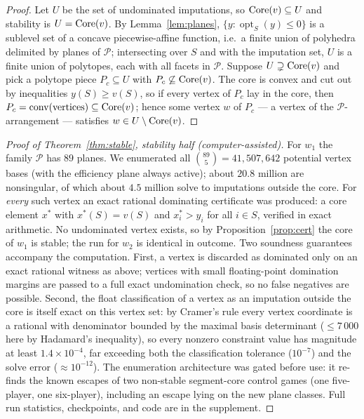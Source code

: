 \begin{proof}
Let $U$ be the set of undominated imputations, so $\operatorname{Core}(v)\subseteq U$ and
stability is $U=\operatorname{Core}(v)$. By Lemma~\ref{lem:planes},
$\{y:\operatorname{opt}_S(y)\le0\}$ is a sublevel set of a concave
piecewise-affine function, i.e.\ a finite union of polyhedra delimited by
planes of $\mathcal P$; intersecting over $S$ and with the imputation set, $U$
is a finite union of polytopes, each with all facets in $\mathcal P$. Suppose
$U\supsetneq\operatorname{Core}(v)$ and pick a polytope piece $P_c\subseteq U$ with
$P_c\not\subseteq\operatorname{Core}(v)$. The core is convex and cut out by inequalities
$y(S)\ge v(S)$, so if every vertex of $P_c$ lay in the core, then
$P_c=\operatorname{conv}(\text{vertices})\subseteq\operatorname{Core}(v)$; hence some vertex
$w$ of $P_c$ --- a vertex of the $\mathcal P$-arrangement --- satisfies
$w\in U\setminus\operatorname{Core}(v)$.
\end{proof}

\begin{proof}[Proof of Theorem~\ref{thm:stable}, stability half
(computer-assisted)]
For $w_1$ the family $\mathcal P$ has $89$ planes. We enumerated all
$\binom{89}{5}=41{,}507{,}642$ potential vertex bases (with the efficiency
plane always active); about $20.8$ million are nonsingular, of which about
$4.5$ million solve to imputations outside the core. For \emph{every} such
vertex an exact rational dominating certificate was produced: a core element
$x^{*}$ with $x^{*}(S)=v(S)$ and $x^{*}_i>y_i$ for all $i\in S$, verified in
exact arithmetic. No undominated vertex exists, so by
Proposition~\ref{prop:cert} the core of $w_1$ is stable; the run for $w_2$ is
identical in outcome. Two soundness guarantees accompany the computation.
First, a vertex is discarded as dominated only on an exact rational witness as
above; vertices with small floating-point domination margins are passed to a
full exact undomination check, so no false negatives are possible. Second, the
float classification of a vertex as an imputation outside the core is itself
exact on this vertex set: by Cramer's rule every vertex coordinate is a
rational with denominator bounded by the maximal basis determinant
($\le7\,000$ here by Hadamard's inequality), so every nonzero constraint value
has magnitude at least $1.4\times10^{-4}$, far exceeding both the
classification tolerance ($10^{-7}$) and the solve error ($\approx10^{-12}$).
The enumeration architecture was gated before use: it re-finds the known
escapes of two non-stable segment-core control games (one five-player, one
six-player), including an escape lying on the new plane classes. Full run
statistics, checkpoints, and code are in the supplement.
\end{proof}

